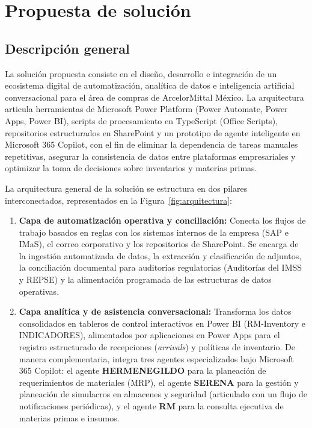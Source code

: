 
\section{Propuesta de solución} \label{sec:propuesta} %

\subsection{Descripción general}

La solución propuesta consiste en el diseño, desarrollo e integración de un ecosistema digital de automatización, analítica de datos e inteligencia artificial conversacional para el área de compras de ArcelorMittal México. La arquitectura articula herramientas de Microsoft Power Platform (Power Automate, Power Apps, Power BI), scripts de procesamiento en TypeScript (Office Scripts), repositorios estructurados en SharePoint y un prototipo de agente inteligente en Microsoft 365 Copilot, con el fin de eliminar la dependencia de tareas manuales repetitivas, asegurar la consistencia de datos entre plataformas empresariales y optimizar la toma de decisiones sobre inventarios y materias primas.

La arquitectura general de la solución se estructura en dos pilares interconectados, representados en la Figura~\ref{fig:arquitectura}:
\begin{enumerate}
    \item \textbf{Capa de automatización operativa y conciliación:} Conecta los flujos de trabajo basados en reglas con los sistemas internos de la empresa (SAP e IMaS), el correo corporativo y los repositorios de SharePoint. Se encarga de la ingestión automatizada de datos, la extracción y clasificación de adjuntos, la conciliación documental para auditorías regulatorias (Auditorías del IMSS y REPSE) y la alimentación programada de las estructuras de datos operativas.
    \item \textbf{Capa analítica y de asistencia conversacional:} Transforma los datos consolidados en tableros de control interactivos en Power BI (RM-Inventory e INDICADORES), alimentados por aplicaciones en Power Apps para el registro estructurado de recepciones (\emph{arrivals}) y políticas de inventario. De manera complementaria, integra tres agentes especializados bajo Microsoft 365 Copilot: el agente \textbf{HERMENEGILDO} para la planeación de requerimientos de materiales (MRP), el agente \textbf{SERENA} para la gestión y planeación de simulacros en almacenes y seguridad (articulado con un flujo de notificaciones periódicas), y el agente \textbf{RM} para la consulta ejecutiva de materias primas e insumos.
\end{enumerate}

